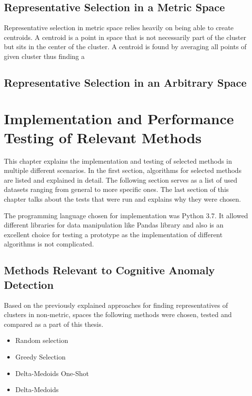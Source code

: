 \documentclass[thesis=B,english]{FITthesis}[2012/10/20]
\begin{document}
\section{Representative Selection in a Metric Space}\label{sec:rep_select_metric}
Representative selection in metric space relies heavily on being able to create centroids.
A centroid is a point in space that is not necessarily part of the cluster but sits in the center of the cluster.
A centroid is found by averaging all points of given cluster thus finding a 

\section{Representative Selection in an Arbitrary Space}\label{sec:rep_select_arbitrary}



\chapter{Implementation and Performance Testing of Relevant Methods}

This chapter explains the implementation and testing of selected methods in multiple different scenarios.
In the first section, algorithms for selected methods are listed and explained in detail.
The following section serves as a list of used datasets ranging from general to more specific ones.
The last section of this chapter talks about the tests that were run and explains why they were chosen.

The programming language chosen for implementation was Python 3.7.                    
It allowed different libraries for data manipulation like Pandas library and also is an excellent choice for testing a prototype as the implementation of different algorithms is not complicated.
                                                                                  
\section{Methods Relevant to Cognitive Anomaly Detection}\label{sec:relevant_methods}                         
Based on the previously explained approaches for finding representatives of clusters in non-metric, spaces the following methods were chosen, tested and compared as a part of this thesis.
\begin{itemize}
    \item Random selection
    \item Greedy Selection
    \item Delta-Medoids One-Shot
    \item Delta-Medoids 
\end{itemize}
\end{document}

